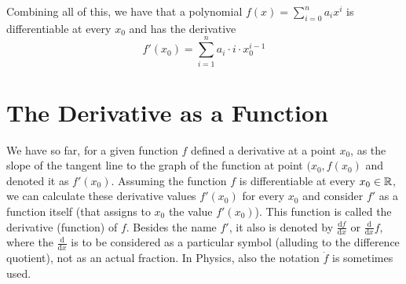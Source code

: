 Combining all of this, we have that a polynomial $f(x)=\sum_{i=0}^n a_ix^i$
is differentiable at every $x_0$ and has the derivative
\[
f'(x_0)=\sum_{i=1}^n a_i\cdot i\cdot x_0^{i-1}
\]

\section{The Derivative as a Function}

We have so far, for a given function $f$ defined a derivative at a point
$x_0$, as the slope of the tangent line to the graph of the function at
point $(x_0,f(x_0)$ and denoted it as $f'(x_0)$. Assuming the function $f$
is differentiable at every
$x_0\in{\mathbb R}$, we can calculate these derivative values $f'(x_0)$ for every
$x_0$ and consider $f'$ as a function itself (that assigns to $x_0$ the
value $f'(x_0)$). This function is called the derivative (function) of $f$.
Besides the name $f'$, it also is denoted by 
$\displaystyle\frac{\mbox{d}f}{\mbox{d}x}$ or
$\displaystyle\frac{\mbox{d}}{\mbox{d}x} f$, where the
$\frac{\mbox{d}}{\mbox{d}x}$ is to be considered as a particular symbol
(alluding to the difference quotient), not
as an actual fraction. In Physics, also the notation $\dot f$ is sometimes
used.

